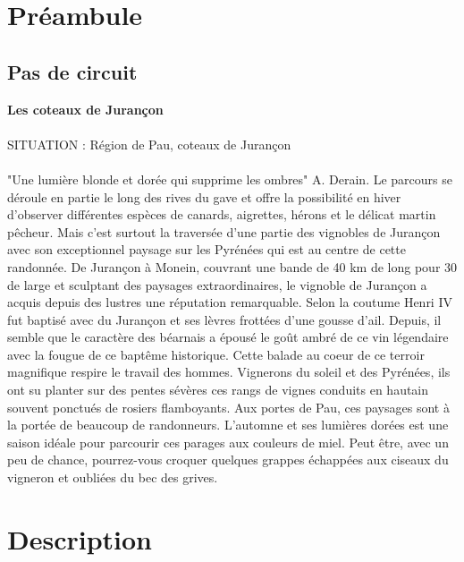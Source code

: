 \documentclass{article}
\begin{document}
        \section{Préambule}
        
        \subsection{Pas de circuit}
    
        \begin{center}
        \textbf{Les coteaux de Jurançon}
        \end{center}
    
        \paragraph{}
        SITUATION : Région de Pau, coteaux de Jurançon
        \paragraph{}
        "Une lumière blonde et dorée qui supprime les ombres" A. Derain. Le parcours se déroule en partie le long des rives du gave et offre la possibilité en hiver d'observer différentes espèces de canards, aigrettes, hérons et le délicat martin pêcheur. Mais c'est surtout la traversée d'une partie des vignobles de Jurançon avec son exceptionnel paysage sur les Pyrénées qui est au centre de cette randonnée. De Jurançon à Monein, couvrant une bande de 40 km de long pour 30 de large et sculptant des paysages extraordinaires, le vignoble de Jurançon a acquis depuis des lustres une réputation remarquable. Selon la coutume Henri IV fut baptisé avec du Jurançon et ses lèvres frottées d'une gousse d'ail. Depuis, il semble que le caractère des béarnais a épousé le goût ambré de ce vin légendaire avec la fougue de ce baptême historique. Cette balade au coeur de ce terroir magnifique respire le travail des hommes. Vignerons du soleil et des Pyrénées, ils ont su planter sur des pentes sévères ces rangs de vignes conduits en hautain souvent ponctués de rosiers flamboyants. Aux portes de Pau, ces paysages sont à la portée de beaucoup de randonneurs. L'automne et ses lumières dorées est une saison idéale pour parcourir ces parages aux couleurs de miel. Peut être, avec un peu de chance, pourrez-vous croquer quelques grappes échappées aux ciseaux du vigneron et oubliées du bec des grives.
        \section{Description}
        
\end{document}
